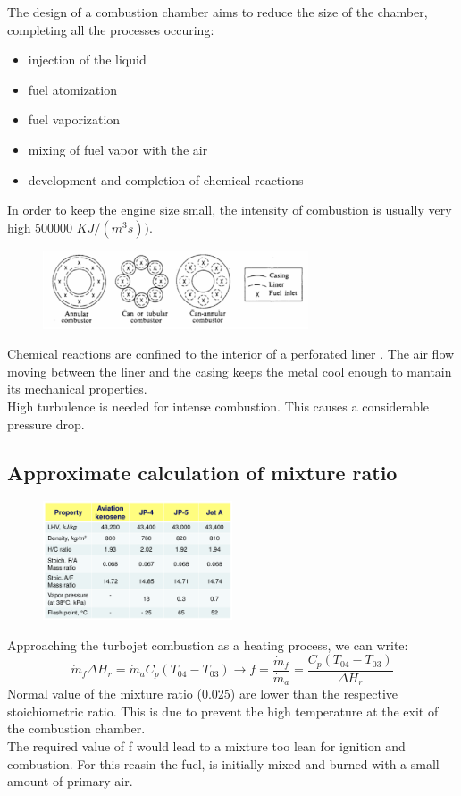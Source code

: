 \documentclass[12pt]{article}
\begin{document}
The design of a combustion chamber aims to reduce the size of the chamber, completing all the processes occuring:
\begin{itemize}
    \item injection of the liquid
    \item fuel atomization
    \item fuel vaporization
    \item mixing of fuel vapor with the air
    \item development and completion of chemical reactions
\end{itemize}
In order to keep the engine size small, the intensity of combustion is usually very high 500000 $KJ/(m^{3}s))$.

\begin{figure}[!ht]
\centering
\includegraphics[width=0.7\textwidth]{figures/gaschamber.png}
\end{figure}

Chemical reactions are confined to the interior of a perforated liner . The air flow moving between the liner and the casing keeps the metal cool enough to mantain its mechanical properties.\\
High turbulence is needed for intense combustion. This causes a considerable pressure drop.

\subsection{Approximate calculation of mixture ratio}

\begin{figure}[!ht]
\centering
\includegraphics[width=0.5\textwidth]{figures/mixturetable.png}
\end{figure}

Approaching the turbojet combustion as a heating process, we can write:
\begin{equation}
    \dot{m}_{f}\Delta H_{r} = \dot{m}_{a}C_{p}(T_{04}-T_{03}) \rightarrow f = \frac{\dot{m}_{f}}{\dot{m}_{a}} = \frac{C_{p}(T_{04}-T_{03})}{\Delta H_{r}}
\end{equation}
Normal value of the mixture ratio (0.025) are lower than the respective stoichiometric ratio. This is due to prevent the high temperature at the exit of the combustion chamber.\\
The required value of f would lead to a mixture too lean for ignition and combustion. For this reasin the fuel, is initially mixed and burned with a small amount of primary air.
\end{document}
